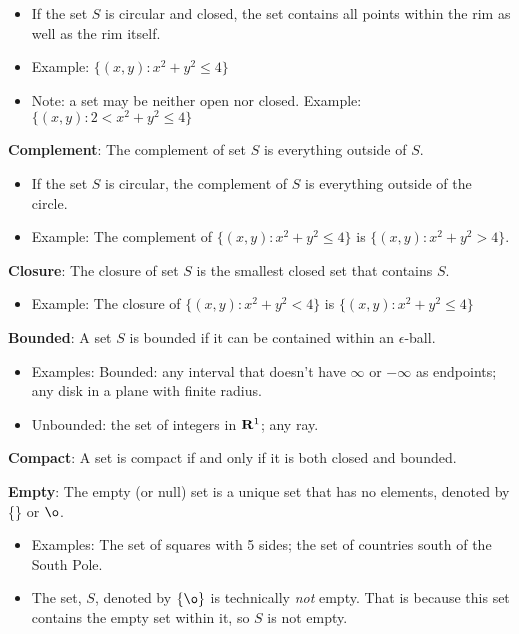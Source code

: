 \documentclass[]{book}
\providecommand{\tightlist}{%
  \setlength{\itemsep}{0pt}\setlength{\parskip}{0pt}}
\theoremstyle{definition}
\theoremstyle{definition}
\theoremstyle{definition}
\theoremstyle{remark}
\begin{document}
\begin{itemize}
\tightlist
\item
  If the set \(S\) is circular and closed, the set contains all points
  within the rim as well as the rim itself.
\item
  Example: \(\{ (x,y) : x^2+y^2\le 4 \}\)
\item
  Note: a set may be neither open nor closed. Example:
  \(\{ (x,y) : 2 < x^2+y^2\le 4 \}\)
\end{itemize}

\textbf{Complement}: The complement of set \(S\) is everything outside
of \(S\).

\begin{itemize}
\tightlist
\item
  If the set \(S\) is circular, the complement of \(S\) is everything
  outside of the circle.
\item
  Example: The complement of \(\{ (x,y) : x^2+y^2\le 4 \}\) is
  \(\{ (x,y) : x^2+y^2 > 4 \}\).
\end{itemize}

\textbf{Closure}: The closure of set \(S\) is the smallest closed set
that contains \(S\).

\begin{itemize}
\tightlist
\item
  Example: The closure of \(\{ (x,y) : x^2+y^2<4 \}\) is
  \(\{ (x,y) : x^2+y^2\le 4 \}\)
\end{itemize}

\textbf{Bounded}: A set \(S\) is bounded if it can be contained within
an \(\epsilon\)-ball.

\begin{itemize}
\tightlist
\item
  Examples: Bounded: any interval that doesn't have \(\infty\) or
  \(-\infty\) as endpoints; any disk in a plane with finite radius.
\item
  Unbounded: the set of integers in \({\bf R}^1\); any ray.
\end{itemize}

\textbf{Compact}: A set is compact if and only if it is both closed and
bounded.

\textbf{Empty}: The empty (or null) set is a unique set that has no
elements, denoted by \{\} or \(\o\).

\begin{itemize}
\tightlist
\item
  Examples: The set of squares with 5 sides; the set of countries south
  of the South Pole.
\item
  The set, \(S\), denoted by \(\{\o\}\) is technically \emph{not} empty.
  That is because this set contains the empty set within it, so \(S\) is
  not empty.
\end{itemize}
\end{document}
